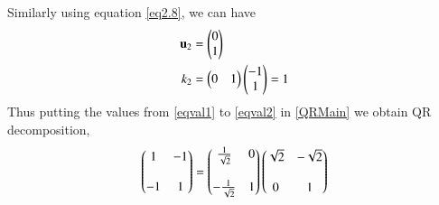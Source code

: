 \documentclass[journal,12pt,twocolumn]{IEEEtran}
\begin{document}
    Similarly using equation \eqref{eq2.8}, we can have 
    \begin{align}
    \mathbf{u}_2 &= \begin{pmatrix}0 \\  1\end{pmatrix} \\
    k_2 &= \begin{pmatrix}0 & 1 \end{pmatrix}\begin{pmatrix}-1\\1\end{pmatrix} = 1\label{eqval2} 
\end{align}
Thus putting the values from \eqref{eqval1} to \eqref{eqval2} in \eqref{QRMain} we obtain QR decomposition,
\begin{align}
    \begin{pmatrix}1 & -1 \\\\ -1 & 1\end{pmatrix} =\begin{pmatrix}\frac{1}{\sqrt{2}}& 0 \\\\ -\frac{1}{\sqrt{2}} & 1 \end{pmatrix}\begin{pmatrix}\sqrt{2} & -\sqrt{2} \\\\ 0 & 1 \end{pmatrix}
\end{align}
\end{document}
